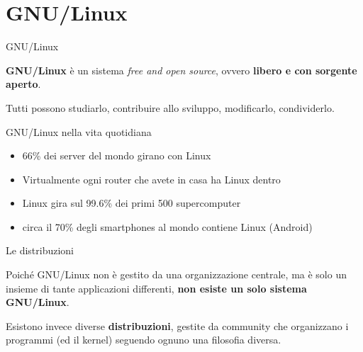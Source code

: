\documentclass[10pt]{beamer}
\begin{document}
\section{GNU/Linux}

\begin{frame}[fragile]{GNU/Linux}

\textbf{GNU/Linux} è un sistema \textit{free and open source}, ovvero \textbf{libero e con sorgente aperto}.

Tutti possono studiarlo, contribuire allo sviluppo, modificarlo, condividerlo.

\end{frame}

\begin{frame}[fragile]{GNU/Linux nella vita quotidiana}

\begin{itemize}
\item 66\% dei server del mondo girano con Linux
\item Virtualmente ogni router che avete in casa ha Linux dentro
\item Linux gira sul 99.6\% dei primi 500 supercomputer
\item circa il 70\% degli smartphones al mondo contiene Linux (Android)
\end{itemize}

\end{frame}

\begin{frame}[fragile]{Le distribuzioni}

Poiché GNU/Linux non è gestito da una organizzazione centrale, ma è solo un insieme di tante applicazioni differenti, \textbf{non esiste un solo sistema GNU/Linux}.

Esistono invece diverse \textbf{distribuzioni}, gestite da community che organizzano i programmi (ed il kernel) seguendo ognuno una filosofia diversa.

\end{frame}
\end{document}
